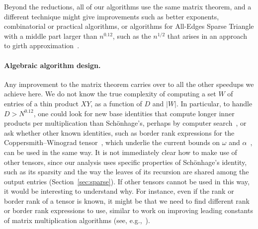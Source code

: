 Beyond the reductions, all of our algorithms use the same matrix theorem, and a different technique might give improvements such as better exponents, combinatorial or practical algorithms, or algorithms for All-Edges Sparse Triangle with a middle part larger than $n^{0.12}$, such as the $n^{1/2}$ that arises in an approach to girth approximation~\cite{RV12}.

\paragraph{Algebraic algorithm design.}
Any improvement to the matrix theorem carries over to all the other speedups we achieve here. We do not know the true complexity of computing a set $W$ of entries of a thin product $XY$, as a function of $D$ and $|W|$. In particular, to handle $D>N^{0.12}$, one could look for new base identities that compute longer inner products per multiplication than Sch\"onhage's, perhaps by computer search~\cite{FBH+22,KM23,Nov25}, or ask whether other known identities, such as border rank expressions for the Coppersmith--Winograd tensor~\cite{CW90},  which underlie the current bounds on $\omega$ and $\alpha$~\cite{VXXZ24,ADVXXZ25,DEK+26}, can be used in the same way. It is not immediately clear how to make use of other tensors, since our analysis uses specific properties of Sch\"onhage's identity, such as its sparsity and the way the leaves of its recursion are shared among the output entries (Section~\ref{sec:sparse}). If other tensors cannot be used in this way, it would be interesting to understand why. For instance, even if the rank or border rank of a tensor is known, it might be that we need to find different rank or border rank expressions to use, similar to work on improving leading constants of matrix multiplication algorithms (see, e.g.,~\cite{BB15,KS20,BS19,AY25,MS25}). 
